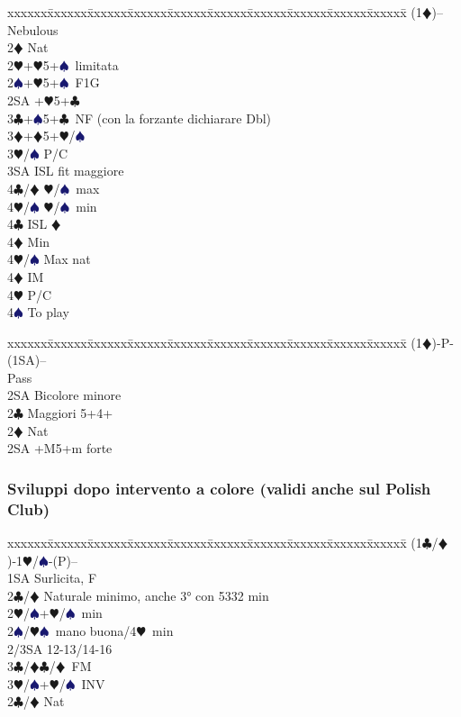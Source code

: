 \documentclass[a4paper,italian]{article}
\newcommand{\BC}{\textcolor{OliveGreen}{$\clubsuit$}}
\newcommand{\BD}{\textcolor{RedOrange}{$\vardiamondsuit$}}
\newcommand{\BH}{\textcolor{Red2}{$\varheartsuit${}}}
\newcommand{\BS}{\textcolor{MidnightBlue}{$\spadesuit${}}}
\newenvironment{bidtable}
{\begin{tabbing}

    xxxxxx\=xxxxxx\=xxxxxx\=xxxxxx\=xxxxxx\=xxxxxx\=xxxxxx\=xxxxxx\=xxxxxx\=xxxxxx\=\kill}
{\end{tabbing} }%
\begin{document}
\begin{multicols}{2}
    \begin{bidtable}
        (1\BD)-- \> Nebulous\+\\
        2\BD \> Nat\\
        2\BH {}+\BH 5+\BS\ limitata\\
        2\BS {}+\BH 5+\BS\ F1G\\
        2SA +\BH 5+\BC \\
        3\BC {}+\BS 5+\BC\ NF (con la forzante dichiarare Dbl)\\
        3\BD {}+\BD 5+\BH /\BS \+\\
        3\BH/\BS \> P/C\\
        3SA \> ISL fit maggiore\+\\
        4\BC/\BD \> \BH /\BS\ max\\
        4\BH/\BS \> \BH /\BS\ min\-\\
        4\BC \> ISL \BD \+\\
        4\BD \> Min\\
        4\BH/\BS \> Max nat\-\\
        4\BD \> IM\\
        4\BH \> P/C\\
        4\BS \> To play\-\-
    \end{bidtable}
    \begin{bidtable}
        (1\BD)-P-(1SA)--\+\\
        Pass\+\\
        2SA \> Bicolore minore\-\\
        2\BC \> Maggiori 5+4+\\
        2\BD \> Nat\\
        2SA +M5+m forte\-
    \end{bidtable}

    \subsubsection{Sviluppi dopo intervento a colore (validi anche sul Polish Club)}

    \begin{bidtable}
        (1\BC/\BD)-1\BH/\BS-(P)--\+\\
        1SA \> Surlicita, F\+\\
        2\BC/\BD \> Naturale minimo, anche 3° con 5332 min\\
        2\BH/\BS {}+\BH/\BS\ min\\
        2\BS/\BH {}\BS\ mano buona/4\BH\ min\\
        2/3SA  12-13/14-16\\
        3\BC/\BD {}\BC/\BD\ FM\\
        3\BH/\BS {}+\BH/\BS\ INV\-\\
        2\BC/\BD \> Nat
    \end{bidtable}
    \columnbreak


\end{multicols}
\end{document}
